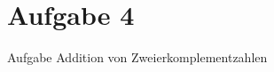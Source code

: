 
\section{Aufgabe 4}

\setcounter{exercise}{1}

\begin{frame}[allowframebreaks]{Aufgabe \thesection}{Addition von Zweierkomplementzahlen}
\end{frame}
